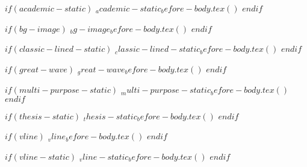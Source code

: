 $if(academic-static)$
$_academic-static_before-body.tex()$
$endif$

$if(bg-image)$
$_bg-image_before-body.tex()$
$endif$

$if(classic-lined-static)$
$_classic-lined-static_before-body.tex()$
$endif$

$if(great-wave)$
$_great-wave_before-body.tex()$
$endif$

$if(multi-purpose-static)$
$_multi-purpose-static_before-body.tex()$
$endif$

$if(thesis-static)$
$_thesis-static_before-body.tex()$
$endif$

$if(vline)$
$_vline_before-body.tex()$
$endif$

$if(vline-static)$
$_vline-static_before-body.tex()$
$endif$
